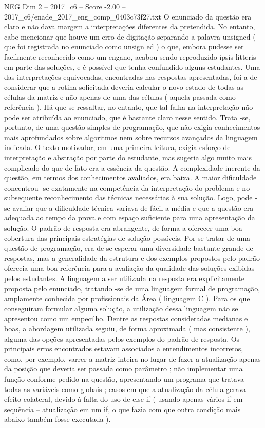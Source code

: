 \begin{textsample}{NEG Dim 2 – 2017\_c6 – Score -2.00 – 2017\_c6/enade\_2017\_eng\_comp\_0403c73f27.txt}
O enunciado da questão era claro e não dava margem a interpretações diferentes da pretendida.
No entanto, cabe mencionar que houve um erro de digitação separando a palavra unsigned ( que foi registrada no enunciado como unsign ed ) o que, embora pudesse ser facilmente reconhecido como um engano, acabou sendo reproduzido ipsis litteris em parte das soluções, e é possível que tenha confundido alguns estudantes.
Uma das interpretações equivocadas, encontradas nas respostas apresentadas, foi a de considerar que a rotina solicitada deveria calcular o novo estado de todas as células da matriz e não apenas de uma das células ( aquela passada como referência ).
Há que se ressaltar, no entanto, que tal falha na interpretação não pode ser atribuída ao enunciado, que é bastante claro nesse sentido.
Trata -se, portanto, de uma questão simples de programação, que não exigia conhecimentos mais aprofundados sobre algoritmos nem sobre recursos avançados da linguagem indicada.
O texto motivador, em uma primeira leitura, exigia esforço de interpretação e abstração por parte do estudante, mas sugeria algo muito mais complicado do que de fato era a essência da questão.
A complexidade inerente da questão, em termos dos conhecimentos avaliados, era baixa.
A maior dificuldade concentrou -se exatamente na competência da interpretação do problema e no subsequente reconhecimento das técnicas necessárias à sua solução.
Logo, pode -se avaliar que a dificuldade técnica variava de fácil a média e que a questão era adequada ao tempo da prova e com espaço suficiente para uma apresentação da solução.
O padrão de resposta era abrangente, de forma a oferecer uma boa cobertura das principais estratégias de solução possíveis.
Por se tratar de uma questão de programação, era de se esperar uma diversidade bastante grande de respostas, mas a generalidade da estrutura e dos exemplos propostos pelo padrão oferecia uma boa referência para a avaliação da qualidade das soluções exibidas pelos estudantes.
A linguagem a ser utilizada na resposta era explicitamente proposta pelo enunciado, tratando -se de uma linguagem formal de programação, amplamente conhecida por profissionais da Área ( linguagem C ).
Para os que conseguiram formular alguma solução, a utilização dessa linguagem não se apresentou como um empecilho.
Dentre as respostas consideradas medianas e boas, a abordagem utilizada seguiu, de forma aproximada ( mas consistente ), alguma das opções apresentadas pelos exemplos do padrão de resposta.
Os principais erros encontrados estavam associados a entendimentos incorretos, como, por exemplo, varrer a matriz inteira no lugar de fazer a atualização apenas da posição que deveria ser passada como parâmetro ; não implementar uma função conforme pedido na questão, apresentando um programa que tratava todas as variáveis como globais ; casos em que a atualização da célula gerava efeito colateral, devido à falta do uso de else if ( usando apenas vários if em sequência – atualização em um if, o que fazia com que outra condição mais abaixo também fosse executada ).

\end{textsample}

